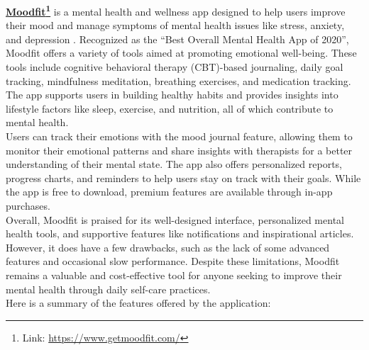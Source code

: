 \textbf{\href{https://www.getmoodfit.com/}{Moodfit}\footnote{Link: \url{https://www.getmoodfit.com/}}} is a mental health and wellness app designed to help users improve their mood and manage symptoms of mental health issues like stress, anxiety, and depression \cite{moodfit-review}. Recognized as the ``Best Overall Mental Health App of 2020'', Moodfit offers a variety of tools aimed at promoting emotional well-being. These tools include cognitive behavioral therapy (CBT)-based journaling, daily goal tracking, mindfulness meditation, breathing exercises, and medication tracking. The app supports users in building healthy habits and provides insights into lifestyle factors like sleep, exercise, and nutrition, all of which contribute to mental health.\vspace{5mm} \\
Users can track their emotions with the mood journal feature, allowing them to monitor their emotional patterns and share insights with therapists for a better understanding of their mental state. The app also offers personalized reports, progress charts, and reminders to help users stay on track with their goals. While the app is free to download, premium features are available through in-app purchases.\vspace{5mm} \\
Overall, Moodfit is praised for its well-designed interface, personalized mental health tools, and supportive features like notifications and inspirational articles. However, it does have a few drawbacks, such as the lack of some advanced features and occasional slow performance. Despite these limitations, Moodfit remains a valuable and cost-effective tool for anyone seeking to improve their mental health through daily self-care practices.\vspace{5mm} \\
Here is a summary of the features offered by the application:\vspace{5mm}

